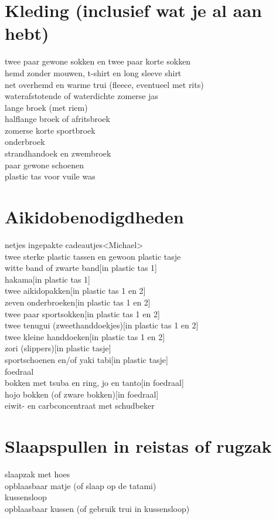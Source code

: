 \documentclass[9pt,twocolumn]{memoir}
\begin{document}
\section*{Kleding (inclusief wat je al aan hebt)}
twee paar gewone sokken en twee paar korte sokken\\
hemd zonder mouwen, t-shirt en long sleeve shirt\\
net overhemd en warme trui (fleece, eventueel met rits)\\
waterafstotende of waterdichte zomerse jas\\
lange broek (met riem)\\
halflange broek of afritsbroek\\
zomerse korte sportbroek\\
onderbroek\\
strandhandoek en zwembroek\\
paar gewone schoenen\\
plastic tas voor vuile was

\section*{Aikidobenodigdheden}
netjes ingepakte cadeautjes\hfill<Michael>\\
twee sterke plastic tassen en gewoon plastic tasje\\
witte band of zwarte band\hfill[in plastic tas 1]\\
hakama\hfill[in plastic tas 1]\\
twee aikidopakken\hfill[in plastic tas 1 en 2]\\
zeven onderbroeken\hfill[in plastic tas 1 en 2]\\
twee paar sportsokken\hfill[in plastic tas 1 en 2]\\
twee tenugui (zweethanddoekjes)\hfill[in plastic tas 1 en 2]\\
twee kleine handdoeken\hfill[in plastic tas 1 en 2]\\
zori (slippers)\hfill[in plastic tasje]\\
sportschoenen en/of yaki tabi\hfill[in plastic tasje]\\
foedraal\\
bokken met tsuba en ring, jo en tanto\hfill[in foedraal]\\
hojo bokken (of zware bokken)\hfill[in foedraal]\\
eiwit- en carbconcentraat met schudbeker

\section*{Slaapspullen in reistas of rugzak}
slaapzak met hoes\\
opblaasbaar matje (of slaap op de tatami)\\
kussensloop\\
opblaasbaar kussen (of gebruik trui in kussensloop)\\
\end{document}

